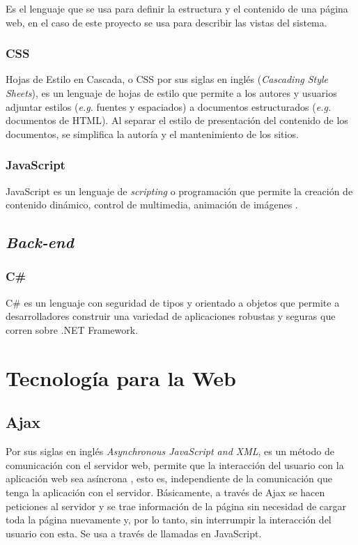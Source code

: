 Es el lenguaje que se usa para definir la estructura y el contenido de una página web, en el caso de este proyecto se usa para describir las vistas del sistema.

\subsubsection{CSS}
Hojas de Estilo en Cascada, o CSS por sus siglas en inglés (\textit{Cascading Style Sheets}), es un lenguaje de hojas de estilo que permite a los autores y usuarios adjuntar estilos (\textit{e.g.} fuentes y espaciados) a documentos estructurados (\textit{e.g.} documentos de HTML). Al separar el estilo de presentación del contenido de los documentos, se simplifica la autoría y el mantenimiento de los sitios. \cite{cssW3C}

\subsubsection{JavaScript}
JavaScript es un lenguaje de \textit{scripting} o programación que permite la creación de contenido dinámico, control de multimedia, animación de imágenes \cite{jsMozilla}.

\subsection{\emph{Back-end}}
\subsubsection{C\#}
C\# es un lenguaje con seguridad de tipos y orientado a objetos que permite a desarrolladores construir una variedad de aplicaciones robustas y seguras que corren sobre .NET Framework. \cite{cSharpMicrosoft}

\section{Tecnología para la Web}
\subsection{Ajax}
Por sus siglas en inglés \emph{Asynchronous JavaScript and XML}, es un método de comunicación con el servidor web, permite que la interacción del usuario con la aplicación web sea asíncrona \cite{ajaxGarrett}, esto es, independiente de la comunicación que tenga la aplicación con el servidor. Básicamente, a través de Ajax se hacen peticiones al servidor y se trae información de la página sin necesidad de cargar toda la página nuevamente y, por lo tanto, sin interrumpir la interacción del usuario con esta. Se usa a través de llamadas en JavaScript.


